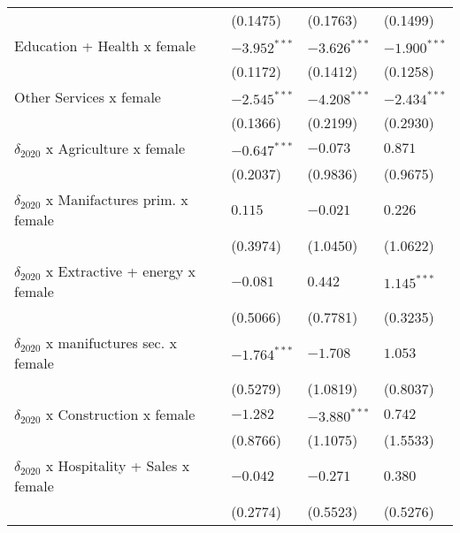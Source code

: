 \begin{tabular}{llll}
                                                   &           (0.1475) &           (0.1763) &           (0.1499) \\
Education + Health x female                        &     $-3.952^{***}$ &     $-3.626^{***}$ &     $-1.900^{***}$ \\
                                                   &           (0.1172) &           (0.1412) &           (0.1258) \\
Other Services x female                            &     $-2.545^{***}$ &     $-4.208^{***}$ &     $-2.434^{***}$ \\
                                                   &           (0.1366) &           (0.2199) &           (0.2930) \\
$\delta_{2020}$ x Agriculture x female             &     $-0.647^{***}$ &           $-0.073$ &            $0.871$ \\
                                                   &           (0.2037) &           (0.9836) &           (0.9675) \\
$\delta_{2020}$ x Manifactures prim. x female      &            $0.115$ &           $-0.021$ &            $0.226$ \\
                                                   &           (0.3974) &           (1.0450) &           (1.0622) \\
$\delta_{2020}$ x Extractive + energy x female     &           $-0.081$ &            $0.442$ &      $1.145^{***}$ \\
                                                   &           (0.5066) &           (0.7781) &           (0.3235) \\
$\delta_{2020}$ x manifuctures sec. x female       &     $-1.764^{***}$ &           $-1.708$ &            $1.053$ \\
                                                   &           (0.5279) &           (1.0819) &           (0.8037) \\
$\delta_{2020}$ x Construction x female            &           $-1.282$ &     $-3.880^{***}$ &            $0.742$ \\
                                                   &           (0.8766) &           (1.1075) &           (1.5533) \\
$\delta_{2020}$ x Hospitality + Sales x female     &           $-0.042$ &           $-0.271$ &            $0.380$ \\
                                                   &           (0.2774) &           (0.5523) &           (0.5276) \\

\end{tabular}
